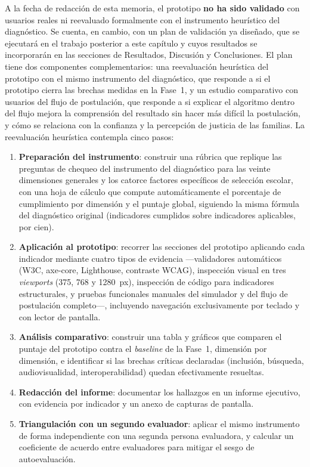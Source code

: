 A la fecha de redacción de esta memoria, el prototipo \textbf{no ha sido validado} con usuarios reales ni reevaluado formalmente con el instrumento heurístico del diagnóstico. Se cuenta, en cambio, con un plan de validación ya diseñado, que se ejecutará en el trabajo posterior a este capítulo y cuyos resultados se incorporarán en las secciones de Resultados, Discusión y Conclusiones. El plan tiene dos componentes complementarios: una reevaluación heurística del prototipo con el mismo instrumento del diagnóstico, que responde a si el prototipo cierra las brechas medidas en la Fase~1, y un estudio comparativo con usuarios del flujo de postulación, que responde a si explicar el algoritmo dentro del flujo mejora la comprensión del resultado sin hacer más difícil la postulación, y cómo se relaciona con la confianza y la percepción de justicia de las familias. La reevaluación heurística contempla cinco pasos:

\begin{enumerate}
    \item \textbf{Preparación del instrumento}: construir una rúbrica que replique las preguntas de chequeo del instrumento del diagnóstico para las veinte dimensiones generales y los catorce factores específicos de selección escolar, con una hoja de cálculo que compute automáticamente el porcentaje de cumplimiento por dimensión y el puntaje global, siguiendo la misma fórmula del diagnóstico original (indicadores cumplidos sobre indicadores aplicables, por cien).
    \item \textbf{Aplicación al prototipo}: recorrer las secciones del prototipo aplicando cada indicador mediante cuatro tipos de evidencia —validadores automáticos (W3C, axe-core, Lighthouse, contraste WCAG), inspección visual en tres \emph{viewports} (375, 768 y 1280~px), inspección de código para indicadores estructurales, y pruebas funcionales manuales del simulador y del flujo de postulación completo—, incluyendo navegación exclusivamente por teclado y con lector de pantalla.
    \item \textbf{Análisis comparativo}: construir una tabla y gráficos que comparen el puntaje del prototipo contra el \emph{baseline} de la Fase~1, dimensión por dimensión, e identificar si las brechas críticas declaradas (inclusión, búsqueda, audiovisualidad, interoperabilidad) quedan efectivamente resueltas.
    \item \textbf{Redacción del informe}: documentar los hallazgos en un informe ejecutivo, con evidencia por indicador y un anexo de capturas de pantalla.
    \item \textbf{Triangulación con un segundo evaluador}: aplicar el mismo instrumento de forma independiente con una segunda persona evaluadora, y calcular un coeficiente de acuerdo entre evaluadores para mitigar el sesgo de autoevaluación.
\end{enumerate}

